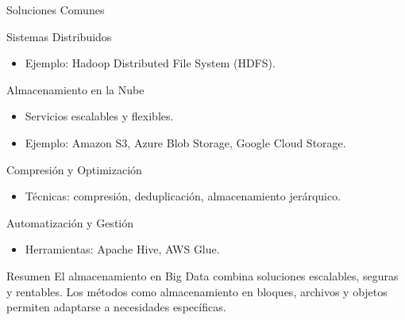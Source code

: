 \documentclass[presentation]{beamer}
\begin{document}
\begin{frame}[label={sec:org94d77d2}]{Soluciones Comunes}
\begin{block}{Sistemas Distribuidos}
\begin{itemize}
\item Ejemplo: Hadoop Distributed File System (HDFS).
\end{itemize}
\end{block}

\begin{block}{Almacenamiento en la Nube}
\begin{itemize}
\item Servicios escalables y flexibles.
\item Ejemplo: Amazon S3, Azure Blob Storage, Google Cloud Storage.
\end{itemize}
\end{block}

\begin{block}{Compresión y Optimización}
\begin{itemize}
\item Técnicas: compresión, deduplicación, almacenamiento jerárquico.
\end{itemize}
\end{block}

\begin{block}{Automatización y Gestión}
\begin{itemize}
\item Herramientas: Apache Hive, AWS Glue.
\end{itemize}
\end{block}
\end{frame}

\begin{frame}[label={sec:org75918b3}]{Resumen}
El almacenamiento en Big Data combina soluciones escalables, seguras y
rentables. Los métodos como almacenamiento en bloques, archivos y
objetos permiten adaptarse a necesidades específicas.
\end{frame}
\end{document}
